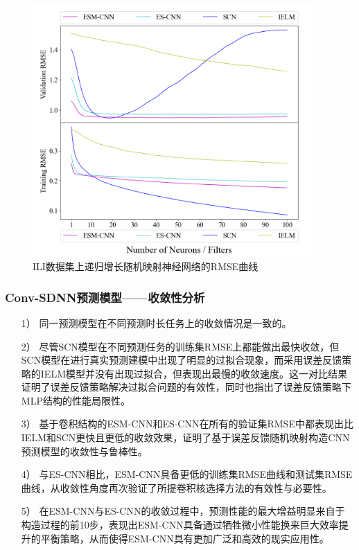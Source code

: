 \begin{frame}
\begin{figure}[!t]
\begin{minipage}[b]{0.32\textwidth}
        \end{minipage}
        \begin{minipage}[b]{0.32\textwidth}
            \includegraphics[width = 0.95\textwidth]{float/ch.cnn/sili_H8_revise.png}
        \end{minipage}

        \caption*{ILI数据集上递归增长随机映射神经网络的RMSE曲线}
    \end{figure}
\end{frame}

\begin{frame}
    \frametitle{Conv-SDNN预测模型——收敛性分析}

    \begin{enumerate}
        \item[1）] 同一预测模型在不同预测时长任务上的收敛情况是一致的。
        \item[2）] 尽管SCN模型在不同预测任务的训练集RMSE上都能做出最快收敛，但SCN模型在进行真实预测建模中出现了明显的过拟合现象，而采用误差反馈策略的IELM模型并没有出现过拟合，但表现出最慢的收敛速度。这一对比结果证明了误差反馈策略解决过拟合问题的有效性，同时也指出了误差反馈策略下MLP结构的性能局限性。
        \item[3）] 基于卷积结构的ESM-CNN和ES-CNN在所有的验证集RMSE中都表现出比IELM和SCN更快且更低的收敛效果，证明了基于误差反馈随机映射构造CNN预测模型的收敛性与鲁棒性。
        \item[4）] 与ES-CNN相比，ESM-CNN具备更低的训练集RMSE曲线和测试集RMSE曲线，从收敛性角度再次验证了所提卷积核选择方法的有效性与必要性。
        \item[5）] 在ESM-CNN与ES-CNN的收敛过程中，预测性能的最大增益明显来自于构造过程的前10步，表现出ESM-CNN具备通过牺牲微小性能换来巨大效率提升的平衡策略，从而使得ESM-CNN具有更加广泛和高效的现实应用性。
    \end{enumerate}

\end{frame}

